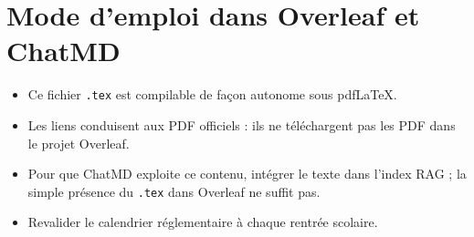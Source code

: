 \documentclass[11pt,a4paper]{article}
\begin{document}
\section{Mode d’emploi dans Overleaf et ChatMD}
\begin{itemize}\item Ce fichier \texttt{.tex} est compilable de façon autonome sous pdfLaTeX.\item Les liens conduisent aux PDF officiels : ils ne téléchargent pas les PDF dans le projet Overleaf.\item Pour que ChatMD exploite ce contenu, intégrer le texte dans l’index RAG ; la simple présence du \texttt{.tex} dans Overleaf ne suffit pas.\item Revalider le calendrier réglementaire à chaque rentrée scolaire.\end{itemize}
\end{document}
